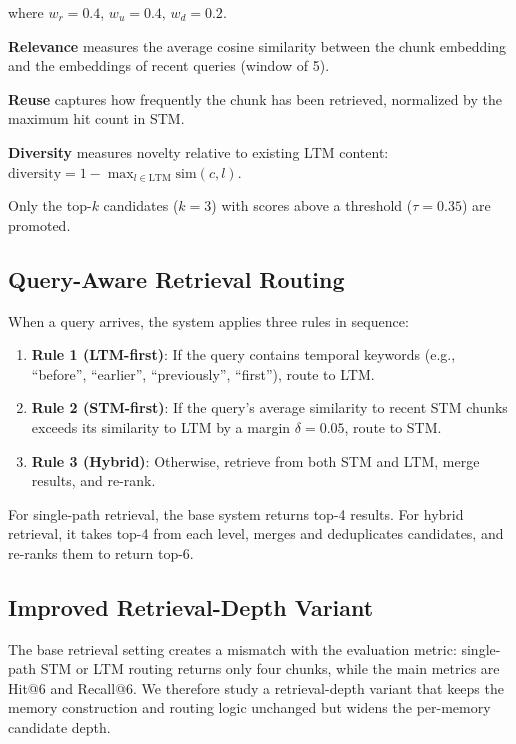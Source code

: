 \documentclass{article}
\begin{document}
where $w_r = 0.4$, $w_u = 0.4$, $w_d = 0.2$.

\textbf{Relevance} measures the average cosine similarity between the chunk embedding and the embeddings of recent queries (window of 5).

\textbf{Reuse} captures how frequently the chunk has been retrieved, normalized by the maximum hit count in STM.

\textbf{Diversity} measures novelty relative to existing LTM content: $\text{diversity} = 1 - \max_{l \in \text{LTM}} \text{sim}(c, l)$.

Only the top-$k$ candidates ($k=3$) with scores above a threshold ($\tau = 0.35$) are promoted.

\subsection{Query-Aware Retrieval Routing}

When a query arrives, the system applies three rules in sequence:

\begin{enumerate}
    \item \textbf{Rule 1 (LTM-first)}: If the query contains temporal keywords (e.g., ``before'', ``earlier'', ``previously'', ``first''), route to LTM.
    \item \textbf{Rule 2 (STM-first)}: If the query's average similarity to recent STM chunks exceeds its similarity to LTM by a margin $\delta = 0.05$, route to STM.
    \item \textbf{Rule 3 (Hybrid)}: Otherwise, retrieve from both STM and LTM, merge results, and re-rank.
\end{enumerate}

For single-path retrieval, the base system returns top-4 results. For hybrid retrieval, it takes top-4 from each level, merges and deduplicates candidates, and re-ranks them to return top-6.

\subsection{Improved Retrieval-Depth Variant}

The base retrieval setting creates a mismatch with the evaluation metric: single-path STM or LTM routing returns only four chunks, while the main metrics are Hit@6 and Recall@6. We therefore study a retrieval-depth variant that keeps the memory construction and routing logic unchanged but widens the per-memory candidate depth.
\end{document}
